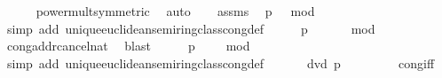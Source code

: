 \begin{isabellebody}
\ \ \ \ \isamarkupfalse%
\ power{\isacharunderscore}{\kern0pt}mult{\isacharbrackleft}{\kern0pt}symmetric{\isacharbrackright}{\kern0pt}\ \isamarkupfalse%
\ auto\isanewline
\ \ \isamarkupfalse%
\ assms{\isacharparenleft}{\kern0pt}{}{\isacharparenright}{\kern0pt}\ \isamarkupfalse%
\ {\isachardoublequoteopen}{\isacharbrackleft}{\kern0pt}p\ {\isacharequal}{\kern0pt}\ {}{\isacharbrackright}{\kern0pt}\ {\isacharparenleft}{\kern0pt}mod\ {}{\isacharparenright}{\kern0pt}{\isachardoublequoteclose}\ \isanewline
\ \ \ \ \isamarkupfalse%
\ {\isacharparenleft}{\kern0pt}simp\ add{\isacharcolon}{\kern0pt}\ unique{\isacharunderscore}{\kern0pt}euclidean{\isacharunderscore}{\kern0pt}semiring{\isacharunderscore}{\kern0pt}class{\isachardot}{\kern0pt}cong{\isacharunderscore}{\kern0pt}def{\isacharparenright}{\kern0pt}\isanewline
\ \ \isamarkupfalse%
\ \isamarkupfalse%
\ {\isachardoublequoteopen}{\isacharbrackleft}{\kern0pt}p\ {\isacharplus}{\kern0pt}\ {}\ {\isacharequal}{\kern0pt}\ {}\ {\isacharplus}{\kern0pt}\ {}{\isacharbrackright}{\kern0pt}\ {\isacharparenleft}{\kern0pt}mod\ {}{\isacharparenright}{\kern0pt}{\isachardoublequoteclose}\ \isanewline
\ \ \isamarkupfalse%
\ cong{\isacharunderscore}{\kern0pt}add{\isacharunderscore}{\kern0pt}rcancel{\isacharunderscore}{\kern0pt}nat\ \isamarkupfalse%
\ blast\isanewline
\ \ \isamarkupfalse%
\ \isamarkupfalse%
\ {\isachardoublequoteopen}{\isacharbrackleft}{\kern0pt}p\ {\isacharplus}{\kern0pt}\ {}\ {\isacharequal}{\kern0pt}\ {}{\isacharbrackright}{\kern0pt}\ {\isacharparenleft}{\kern0pt}mod\ {}{\isacharparenright}{\kern0pt}{\isachardoublequoteclose}\ \isanewline
\ \ \ \ \isamarkupfalse%
\ {\isacharparenleft}{\kern0pt}simp\ add{\isacharcolon}{\kern0pt}\ unique{\isacharunderscore}{\kern0pt}euclidean{\isacharunderscore}{\kern0pt}semiring{\isacharunderscore}{\kern0pt}class{\isachardot}{\kern0pt}cong{\isacharunderscore}{\kern0pt}def{\isacharparenright}{\kern0pt}\isanewline
\ \ \isamarkupfalse%
\ \isamarkupfalse%
\ {\isachardoublequoteopen}{}\ dvd\ p\ {\isacharplus}{\kern0pt}\ {}{\isachardoublequoteclose}\ \isanewline
\ \ \ \ \isamarkupfalse%
\ cong{\isacharunderscore}{\kern0pt}{}{\isacharunderscore}{\kern0pt}iff\ \isamarkupfalse%

\end{isabellebody}
